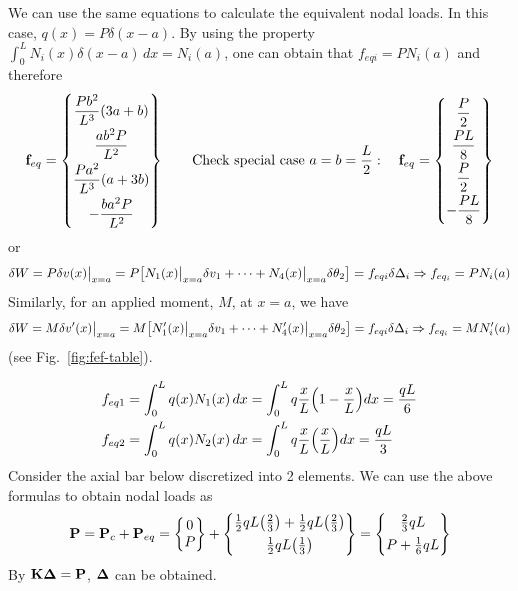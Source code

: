 \begin{example}
\leavevmode
\begin{fig}
  
\end{fig}
We can use the same equations to calculate the equivalent nodal loads. In this case, $q(x) = P\delta(x-a)$. By using the property $\int_0^L N_i(x)\delta(x-a)\,dx = N_i(a)$, one can obtain that $f_{eqi} = PN_i(a)$ and therefore
\begin{equation*}
  \mathbf{f}_{eq} = \begin{Bmatrix}\dfrac{Pb^2}{L^3}(3a+b)\\[6pt] \dfrac{ab^2P}{L^2}\\[6pt] \dfrac{Pa^2}{L^3}(a+3b)\\[6pt] -\dfrac{ba^2P}{L^2}\end{Bmatrix}
  \qquad\text{Check special case } a = b = \frac L2:\quad
  \mathbf{f}_{eq} = \begin{Bmatrix}\dfrac P2\\[6pt] \dfrac{PL}{8}\\[6pt] \dfrac P2\\[6pt] -\dfrac{PL}{8}\end{Bmatrix}
\end{equation*}
or
\begin{equation*}
  \delta W = P\delta v(x)\big|_{x=a} = P\bigl[N_1(x)\big|_{x=a}\delta v_1 + \dots + N_4(x)\big|_{x=a}\delta\theta_2\bigr] = f_{eqi}\delta\Delta_i \Rightarrow f_{eq_i} = PN_i(a)
\end{equation*}
Similarly, for an applied moment, $M$, at $x = a$, we have
\begin{equation*}
  \delta W = M\delta v'(x)\big|_{x=a} = M\bigl[N_1'(x)\big|_{x=a}\delta v_1 + \dots + N_4'(x)\big|_{x=a}\delta\theta_2\bigr] = f_{eqi}\delta\Delta_i \Rightarrow f_{eq_i} = MN_i'(a)
\end{equation*}
(see Fig.~\ref{fig:fef-table}).
\end{example}

\begin{example}
\leavevmode
\begin{fig}
  
\end{fig}
\begin{align*}
  f_{eq1} &= \int_0^L q(x)N_1(x)\,dx = \int_0^L q\frac xL\Bigl(1-\frac xL\Bigr)dx = \frac{qL}{6}\\
  f_{eq2} &= \int_0^L q(x)N_2(x)\,dx = \int_0^L q\frac xL\Bigl(\frac xL\Bigr)dx = \frac{qL}{3}
\end{align*}
Consider the axial bar below discretized into 2 elements. We can use the above formulas to obtain nodal loads as
\begin{equation*}
  \mathbf{P} = \mathbf{P}_c + \mathbf{P}_{eq} = \begin{Bmatrix}0\\ P\end{Bmatrix} + \begin{Bmatrix}\frac12qL\bigl(\frac23\bigr)+\frac12qL\bigl(\frac23\bigr)\\[4pt] \frac12qL\bigl(\frac13\bigr)\end{Bmatrix} = \begin{Bmatrix}\frac23qL\\[4pt] P+\frac16qL\end{Bmatrix}
\end{equation*}
By $\mathbf{K}\bm{\Delta} = \mathbf{P}$, $\bm{\Delta}$ can be obtained.
\begin{fig}
  
\end{fig}
\end{example}
